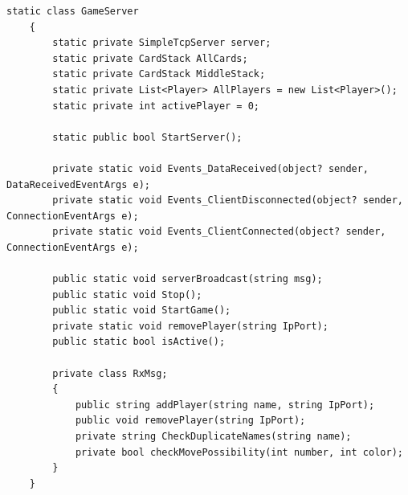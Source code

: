 \begin{lstlisting}[label={code:gameserver}, caption={Codeausschnitt Klasse \textit{GameServer}}]
	static class GameServer
	{
		static private SimpleTcpServer server;
		static private CardStack AllCards;
		static private CardStack MiddleStack;
		static private List<Player> AllPlayers = new List<Player>();
		static private int activePlayer = 0;
		
		static public bool StartServer();
		
		private static void Events_DataReceived(object? sender, DataReceivedEventArgs e);
		private static void Events_ClientDisconnected(object? sender, ConnectionEventArgs e);
		private static void Events_ClientConnected(object? sender, ConnectionEventArgs e);
		
		public static void serverBroadcast(string msg);
		public static void Stop();
		public static void StartGame();
		private static void removePlayer(string IpPort);
		public static bool isActive();
		
		private class RxMsg;
		{
			public string addPlayer(string name, string IpPort);
			public void removePlayer(string IpPort);
			private string CheckDuplicateNames(string name);
			private bool checkMovePossibility(int number, int color);
		}
	}
\end{lstlisting}
